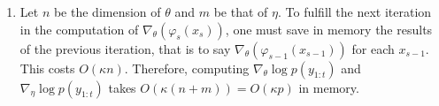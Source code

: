 \documentclass[a4paper,11pt, hidelinks]{article}
\begin{document}
\begin{enumerate}[label=(\alph*)]
	\item Let $n$ be the dimension of $\theta$ and $m$ be that of $\eta$. To fulfill the next iteration in the computation of $\nabla_\theta(\varphi_{s}(x_s))$, one must save in memory the results of the previous iteration, that is to say $\nabla_\theta(\varphi_{s-1}(x_{s-1}))$ for each $x_{s-1}$. This costs $O(\kappa n)$. Therefore, computing $\nabla_\theta \log p(y_{1:t})$ and $\nabla_\eta \log p(y_{1:t})$ takes $O(\kappa (n+m)) = O(\kappa p)$ in memory.
 \end{enumerate}


\newpage


\end{document}
